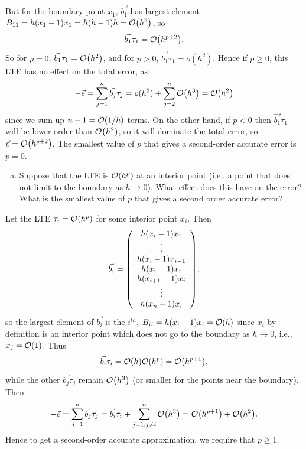 \documentclass[12pt]{article}
\begin{document}
\noindent But for the boundary point $x_1$, $\vec{b_1}$ has largest element $B_{11} = h(x_1 -1)x_1 = h(h-1)h = \order{h^2}$,
so $$\vec{b_1}\tau_1 = \order{h^{p+2}}.$$
So for $p= 0$, $\vec{b_1}\tau_1 = \order{h^2}$, and for $p>0$, $\vec{b_1}\tau_1 = o(h^2)$.
Hence if $p \geq 0$, this LTE has no effect on the total error, as 
$$-\vec{e} = \sum_{j=1}^n \vec{b_j}\tau_j = o(h^2) + \sum_{j=2}^n \order{h^3} = \order{h^2}$$
since we sum up $n-1 = \order{1/h}$ terms.
On the other hand, if $p<0$ then $\vec{b_1}\tau_1$ will be lower-order than $\order{h^2}$, so it will dominate the total error, so $\vec{e} = \order{h^{p+2}}$.  The smallest value of $p$ that gives a second-order accurate error is $p=0$.
\begin{enumerate}[(b)]
\item Suppose that the LTE is $\order{h^p}$ at an interior point (i.e., a point that does not limit to the boundary as $h\to0$). What effect does this have on the error? What is the smallest value of $p$ that gives a second order accurate error?
\end{enumerate}

Let the LTE $\tau_i = \order{h^p}$ for some interior point $x_i$. Then
\begin{align*}
\vec{b_i} = \qty(\begin{array}{c}
              h(x_i - 1)x_1 \\
               \vdots \\
               h(x_i - 1)x_{i-1} \\
               h(x_i - 1)x_{i} \\
               h(x_{i+1} - 1)x_{i} \\
               \vdots \\
               h(x_n - 1)x_i   
            \end{array}),
\end{align*}
so the largest element of $\vec{b_i}$ is the $i^{th}$, $B_{ii} = h(x_i - 1)x_i  = \order{h}$ since $x_i$ by definition is an interior point which does not go to the boundary as $h\to0$, i.e., $x_j = \order{1}$.  Thus $$\vec{b_i}\tau_i = \order{h} \order{h^p} = \order{h^{p+1}},$$ while the other $\vec{b_j}\tau_j$ remain $\order{h^3}$ (or smaller for the points near the boundary).   Then 
$$-\vec{e}=\sum_{j=1}^n \vec{b_j}\tau_j = \vec{b_i}\tau_i + \sum_{j=1, j\neq i}^n \order{h^3}= \order{h^{p+1}} + \order{h^2}.$$  Hence to get a second-order accurate approximation, we require that $p\geq 1$.
\end{document}
